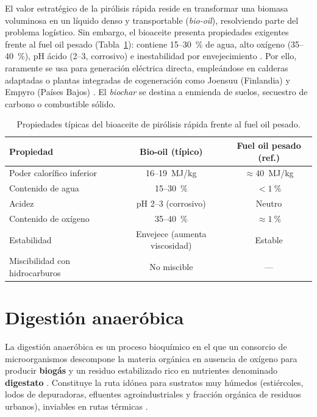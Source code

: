 El valor estratégico de la pirólisis rápida reside en transformar una biomasa voluminosa en un líquido denso y transportable (\textit{bio-oil}), resolviendo parte del problema logístico. Sin embargo, el bioaceite presenta propiedades exigentes frente al fuel oil pesado (Tabla~\ref{tab:biooil}): contiene 15--30~\% de agua, alto oxígeno (35--40~\%), pH ácido (2--3, corrosivo) e inestabilidad por envejecimiento \cite{elliott2017roundrobin}. Por ello, raramente se usa para generación eléctrica directa, empleándose en calderas adaptadas o plantas integradas de cogeneración como Joensuu (Finlandia) y Empyro (Países Bajos) \cite{ieabioenergy_task34}. El \textit{biochar} se destina a enmienda de suelos, secuestro de carbono o combustible sólido.

\begin{table}[htbp]
\centering
\caption{Propiedades típicas del bioaceite de pirólisis rápida frente al fuel oil pesado.}
\label{tab:biooil}
\begin{tabular}{@{}lcc@{}}
\toprule
\textbf{Propiedad} & \textbf{Bio-oil (típico)} & \textbf{Fuel oil pesado (ref.)} \\
\midrule
Poder calorífico inferior & 16--19~MJ/kg & $\approx 40$~MJ/kg \\
Contenido de agua & 15--30~\% & $< 1~\%$ \\
Acidez & pH 2--3 (corrosivo) & Neutro \\
Contenido de oxígeno & 35--40~\% & $\approx 1~\%$ \\
Estabilidad & Envejece (aumenta viscosidad) & Estable \\
Miscibilidad con hidrocarburos & No miscible & --- \\
\bottomrule
\end{tabular}
\end{table}

\section{Digestión anaeróbica}
\label{sec:digestion}

La digestión anaeróbica es un proceso bioquímico en el que un consorcio de microorganismos descompone la materia orgánica en ausencia de oxígeno para producir \textbf{biogás} y un residuo estabilizado rico en nutrientes denominado \textbf{digestato} \cite{alseadi2008biogas, idae2007digestores}. Constituye la ruta idónea para sustratos muy húmedos (estiércoles, lodos de depuradoras, efluentes agroindustriales y fracción orgánica de residuos urbanos), inviables en rutas térmicas \cite{ieabioenergy2024task37}.

